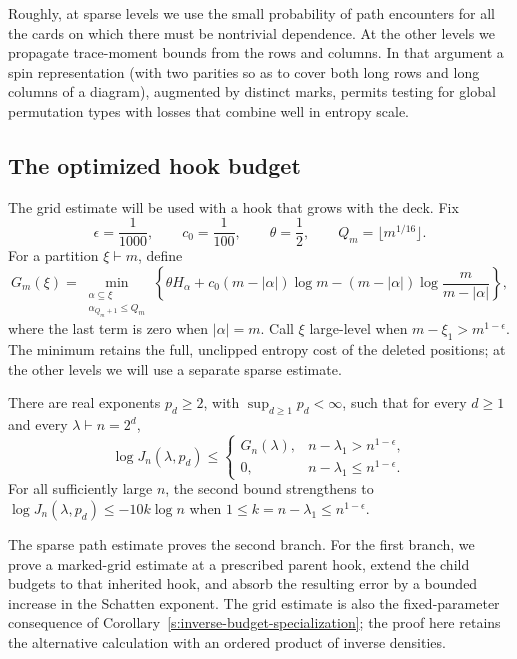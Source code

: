 Roughly, at sparse levels we use the small probability of path encounters for all the cards on which there must be nontrivial dependence. At the other levels we propagate trace-moment bounds from the rows and columns. In that argument a spin representation (with two parities so as to cover both long rows and long columns of a diagram), augmented by distinct marks, permits testing for global permutation types with losses that combine well in entropy scale.

\subsection{The optimized hook budget}

The grid estimate will be used with a hook that grows with the deck.
Fix
\[
 \epsilon=\frac1{1000},\qquad c_0=\frac1{100},\qquad
 \theta=\frac12,\qquad Q_m=\lfloor m^{1/16}\rfloor.
\]
For a partition $\xi\vdash m$, define
\[
 G_m(\xi)=\min_{\substack{\alpha\subseteq\xi\\
                         \alpha_{Q_m+1}\le Q_m}}
 \left\{\theta H_\alpha+c_0(m-|\alpha|)\log m
             -(m-|\alpha|)\log\frac{m}{m-|\alpha|}\right\},
\]
where the last term is zero when $|\alpha|=m$.
Call $\xi$ large-level when $m-\xi_1>m^{1-\epsilon}$.
The minimum retains the full, unclipped entropy cost of the deleted
positions; at the other levels we will use a separate sparse estimate.

\begin{proposition}
\label{s:inverse-bounded-exponent}
There are real exponents $p_d\ge2$, with $\sup_{d\ge1}p_d<\infty$,
such that for every $d\ge1$ and every $\lambda\vdash n=2^d$,
\[
 \log J_n(\lambda,p_d)\le
 \begin{cases}
 G_n(\lambda),&n-\lambda_1>n^{1-\epsilon},\\
 0,&n-\lambda_1\le n^{1-\epsilon}.
 \end{cases}
\]
For all sufficiently large $n$, the second bound strengthens to
$\log J_n(\lambda,p_d)\le-10k\log n$ when
$1\le k=n-\lambda_1\le n^{1-\epsilon}$.
\end{proposition}

The sparse path estimate proves the second branch. For the first branch,
we prove a marked-grid estimate at a prescribed parent hook, extend the
child budgets to that inherited hook, and absorb the resulting error by
a bounded increase in the Schatten exponent. The grid estimate is also
the fixed-parameter consequence of
Corollary~\ref{s:inverse-budget-specialization}; the proof here retains
the alternative calculation with an ordered product of inverse densities.

